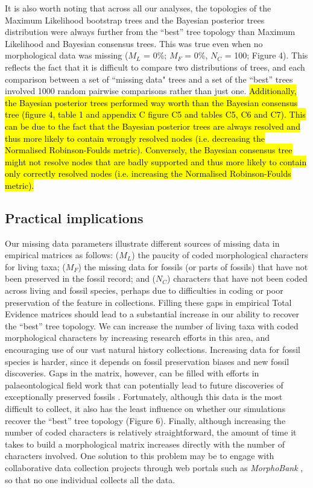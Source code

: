\documentclass[12pt,letterpaper]{article}
\begin{document}
It is also worth noting that across all our analyses, the topologies of the Maximum Likelihood bootstrap trees and the Bayesian posterior trees distribution were always further from the ``best'' tree topology than Maximum Likelihood and Bayesian consensus trees.
This was true even when no morphological data was missing ($M_{L}$ = 0\%; $M_{F}$ = 0\%, $N_{C}$ = 100; Figure 4).
This reflects the fact that it is difficult to compare two distributions of trees, and each comparison between a set of ``missing data" trees and a set of the ``best'' trees involved 1000 random pairwise comparisons rather than just one.
\hl{Additionally, the Bayesian posterior trees performed way worth than the Bayesian consensus tree (figure 4, table 1 and appendix C figure C5 and tables C5, C6 and C7).
This can be due to the fact that the Bayesian posterior trees are always resolved and thus more likely to contain wrongly resolved nodes (i.e. decreasing the Normalised Robinson-Foulds metric).
Conversely, the Bayesian consensus tree might not resolve nodes that are badly supported and thus more likely to contain only correctly resolved nodes (i.e. increasing the Normalised Robinson-Foulds metric).}


\subsection{Practical implications}
Our missing data parameters illustrate different sources of missing data in empirical matrices as follows: ($M_{L}$) the paucity of coded morphological characters for living taxa; ($M_{F}$) the missing data for fossils (or parts of fossils) that have not been preserved in the fossil record; and ($N_{C}$) characters that have not been coded across living and fossil species, perhaps due to difficulties in coding or poor preservation of the feature in collections.
Filling these gaps in empirical Total Evidence matrices should lead to a substantial increase in our ability to recover the ``best'' tree topology.
We can increase the number of living taxa with coded morphological characters by increasing research efforts in this area, and encouraging use of our vast natural history collections.
Increasing data for fossil species is harder, since it depends on fossil preservation biases and new fossil discoveries.
Gaps in the matrix, however, can be filled with efforts in palaeontological field work that can potentially lead to future discoveries of exceptionally preserved fossils \citep[e.g.][]{nithe2013}.
Fortunately, although this data is the most difficult to collect, it also has the least influence on whether our simulations recover the ``best'' tree topology (Figure 6).
Finally, although increasing the number of coded characters is relatively straightforward, the amount of time it takes to build a morphological matrix increases directly with the number of characters involved.
One solution to this problem may be to engage with collaborative data collection projects through web portals such as \textit{MorphoBank} \citep{morphobank}, so that no one individual collects all the data.
\end{document}
